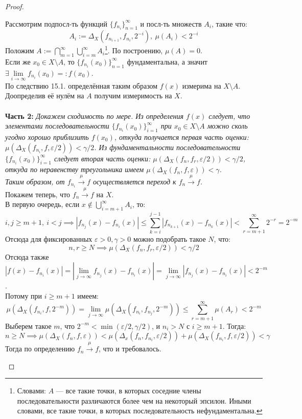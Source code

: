 \documentclass[11pt,a4paper]{report}
\def\eps{\varepsilon}
\theoremstyle{definition}
\theoremstyle{definition}
\theoremstyle{definition}
\begin{document}
\begin{proof}
\begin{itemize}
				Рассмотрим подпосл-ть функций $ \{f_{n_{i}}\}_{n=1}^{\infty} $ и посл-ть множеств $ A_{i} $, такие что: 
				\[ A_{i} := \Delta_{X}(f_{n_{i+1}}, f_{n_{i}}, 2^{-i}),\ \mu(A_{i}) < 2^{-i} \]
				Положим $ A := \bigcap\limits_{m=1}^{\infty}{\bigcup\limits_{i=m}^{\infty}}{A_{i}} $\footnote{Словами: $ A $ — все такие точки, в которых соседние члены последовательности различаются более чем на некоторый эпсилон. Иными словами, все такие точки, в которых последовательность нефундаментальна.}. По построению, $ \mu(A) = 0 $.\\
				Если же $ x_{0} \in X \setminus A $, то $ \{f_{n_{i}}(x_{0})\}_{n=1}^{\infty} $ фундаментальна, а значит $ \exists \lim\limits_{i\to\infty}{f_{n_{i}}(x_{0})} =: f(x_{0}) $.\\
				По следствию 15.1. определённая таким образом $ f(x) $ измерима на $ X \setminus A $.\\ 
				Доопределив её нулём на $ A $ получим измеримость на $ X $.\\\\
				\textbf{Часть 2:} \textit{Докажем сходимость по мере. Из определения $ f(x) $ следует, что элементами последовательности $ \{f_{n_{i}}(x_{0})\}_{i=1}^{\infty} $ при $ x_{0} \in X \setminus A $ можно сколь угодно хорошо приблизить $ f(x_{0}) $, откуда получается первая часть оценки: $ \mu(\Delta_{X}(f_{n_{i}}, f, \eps/2)) < \gamma/2 $. Из фундаментальности последовательности $ \{f_{n_{i}}(x_{0})\}_{i=1}^{\infty} $ следует вторая часть оценки: $ \mu(\Delta_{X}(f_{n}, f_{r}, \eps/2)) < \gamma/2 $, откуда по неравенству треугольника имеем $ \mu(\Delta_{X}(f_{n}, f, \eps)) < \gamma $.\\Таким образом, от $ f_{n_{i}} \xrightarrow{\mu} f $ осуществляется переход к $ f_{n} \xrightarrow{\mu} f $.}\\ 
				
				Покажем теперь, что $ f_{n} \xrightarrow{\mu} f $ на $ X $.\\
				В первую очередь, если $ x \not \in  \bigcup\limits_{i=m+1}^{\infty}{A_{i}} $, то:
				\[ i, j \ge m + 1,\ i < j \implies|f_{n_{j}}(x) - f_{n_{i}}(x)| \le \sum_{k=i}^{j-1}{ |f_{n_{k+1}}(x) - f_{n_{k}}(x)| } < \sum_{r=m+1}^{\infty}{2^{-r}} = 2^{-m} \]
				Отсюда для фиксированных $ \eps > 0, \gamma > 0 $ можно подобрать такое $ N $, что:
				\[
				n, r \ge N \implies \mu(\Delta_{X}(f_{n}, f_{r}, \eps/2)) < \gamma/2
				\]
				Отсюда также $ |f(x) - f_{n_{i}}(x)| = \left |\lim\limits_{j\to\infty}f_{n_{j}}(x) - f_{n_{i}}(x)\right | = \lim\limits_{j\to\infty}|f_{n_{j}}(x) - f_{n_{i}}(x)| < 2^{-m} $.\\ 
				Потому при $ i \ge m + 1 $ имеем:
				\[
					\mu(\Delta_{X}(f_{n_{i}}, f, 2^{-m})) = \lim_{j\to\infty}\mu(\Delta_{X}(f_{n_{i}}, f_{n_{j}}, 2^{-m})) \le \sum\limits_{r=m+1}^{\infty}{\mu(A_{r})} < 2^{-m}
				\]
				Выберем такое $ m $, что $ 2^{-m} < \min(\eps/2, \gamma/2) $, и $ n_{i} > N $ с $ i \ge m+1 $. Тогда:
				\[
					n \ge N \implies \mu(\Delta_{X}(f_{n}, f, \eps)) < \mu(\Delta_{x}(f_{n}, f_{n_{i}}, \eps/2)) + \mu(\Delta_{X}(f_{n_{i}}, f, \eps/2)) < \gamma
				\]
				Тогда по определению $ f_{n} \xrightarrow{\mu} f $, что и требовалось.
			\end{itemize}
		\end{proof}
\end{document}
